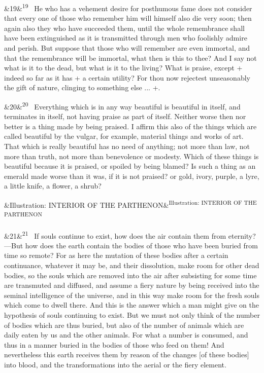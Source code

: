 \documentclass[12pt]{article}
\newcommand{\para}[1][]{\par\noindent\ifx&#1&\else\textsuperscript{\footnotesize #1}~\fi}
\begin{document}
\para[19] He who has a vehement desire for posthumous fame does not consider
that every one of those who remember him will himself also die very
soon; then again also they who have succeeded them, until the whole
remembrance shall have been extinguished as it is transmitted through
men who foolishly admire and perish. But suppose that those who will
remember are even immortal, and that the remembrance will be immortal,
what then is this to thee? And I say not what is it to the dead, but
what is it to the living? What is praise, except + indeed so far as it
has + a certain utility? For thou now rejectest unseasonably the gift
of nature, clinging to something else ... +.

\para[20] Everything which is in any way beautiful is beautiful in itself, and
terminates in itself, not having praise as part of itself. Neither worse
then nor better is a thing made by being praised. I affirm this also of
the things which are called beautiful by the vulgar, for example,
material things and works of art. That which is really beautiful has no
need of anything; not more than law, not more than truth, not more than
benevolence or modesty. Which of these things is beautiful because it
is praised, or spoiled by being blamed? Is such a thing as an emerald
made worse than it was, if it is not praised? or gold, ivory, purple, a
lyre, a little knife, a flower, a shrub?

\para [Illustration: INTERIOR OF THE PARTHENON]

\para[21] If souls continue to exist, how does the air contain them from
eternity?---But how does the earth contain the bodies of those who have
been buried from time so remote? For as here the mutation of these
bodies after a certain continuance, whatever it may be, and their
dissolution, make room for other dead bodies, so the souls which are
removed into the air after subsisting for some time are transmuted and
diffused, and assume a fiery nature by being received into the seminal
intelligence of the universe, and in this way make room for the fresh
souls which come to dwell there. And this is the answer which a man
might give on the hypothesis of souls continuing to exist. But we must
not only think of the number of bodies which are thus buried, but also
of the number of animals which are daily eaten by us and the other
animals. For what a number is consumed, and thus in a manner buried in
the bodies of those who feed on them! And nevertheless this earth
receives them by reason of the changes [of these bodies] into blood, and
the transformations into the aerial or the fiery element.
\end{document}
